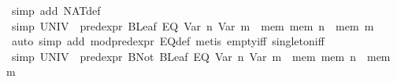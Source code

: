 \begin{isabellebody}
\isamarkupfalse%
\ {}simp\ add{}\ NAT{}def{}%
\endisatagproof
{\isafoldproof}%
%
\isadelimproof
\isanewline
%
\endisadelimproof
\isanewline
{}\isamarkupfalse%
\ {}simp{}{}\ {}UNIV\ {}\ pred{}expr\ {}BLeaf\ {}EQ\ {}Var\ n{}\ {}Var\ m{}{}{}\ {}\ {}mem{}\ mem\ n\ {}\ mem\ m{}{}\isanewline
%
\isadelimproof
\ \ %
\endisadelimproof
%
\isatagproof
{}\isamarkupfalse%
\ {}auto\ simp\ add{}\ mod{}pred{}expr\ EQ{}def{}\ {}metis\ empty{}iff\ singleton{}iff{}{}%
\endisatagproof
{\isafoldproof}%
%
\isadelimproof
\isanewline
%
\endisadelimproof
\isanewline
{}\isamarkupfalse%
\ {}simp{}{}\ {}UNIV\ {}\ pred{}expr\ {}BNot\ {}BLeaf\ {}EQ\ {}Var\ n{}\ {}Var\ m{}{}{}{}\ {}\ {}mem{}\ mem\ n\ {}\ mem\ m{}{}\isanewline

\end{isabellebody}
